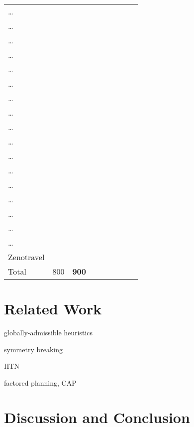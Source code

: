 {\begin{table}[htb]
\begin{tabular}{l|ll|ll|ll|ll|}
\ldots{} &  &  &  &  &  &  &  & \\
\ldots{} &  &  &  &  &  &  &  & \\
\ldots{} &  &  &  &  &  &  &  & \\
\ldots{} &  &  &  &  &  &  &  & \\
\ldots{} &  &  &  &  &  &  &  & \\
\ldots{} &  &  &  &  &  &  &  & \\
\ldots{} &  &  &  &  &  &  &  & \\
\ldots{} &  &  &  &  &  &  &  & \\
\ldots{} &  &  &  &  &  &  &  & \\
\ldots{} &  &  &  &  &  &  &  & \\
\ldots{} &  &  &  &  &  &  &  & \\
\ldots{} &  &  &  &  &  &  &  & \\
\ldots{} &  &  &  &  &  &  &  & \\
\ldots{} &  &  &  &  &  &  &  & \\
\ldots{} &  &  &  &  &  &  &  & \\
\ldots{} &  &  &  &  &  &  &  & \\
\ldots{} &  &  &  &  &  &  &  & \\
Zenotravel &  &  &  &  &  &  &  & \\
\hline
Total & 800 & \textbf{900} &  &  &  &  &  & \\
\end{tabular}
\end{table}

}
\section{Related Work}
\label{sec-4}

globally-admissible heuristics

symmetry breaking

HTN

factored planning, CAP
\section{Discussion and Conclusion}
\label{sec-5}
